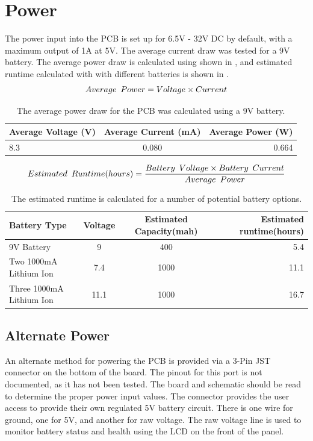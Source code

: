 \section{Power}
The power input into the PCB is set up for 6.5V - 32V DC by default, with a maximum output of 1A at 5V.  The average current draw was tested for a 9V battery. The average power draw is calculated using  shown in , and estimated runtime calculated with with  different batteries is shown in .
\begin{equation}
\label{eqn:PVI}
Average\hspace{.5em} Power = Voltage \times Current
\end{equation}
\begin{table}[H]
	\centering
	\begin{tabular}{lcr}
		\toprule
		Average Voltage (V) & Average Current (mA) & Average Power (W) \\
		\midrule
		8.3 & 0.080 & 0.664 \\
		\bottomrule
	\end{tabular}
	\caption{The average power draw for the PCB was calculated using a 9V battery.}
	\label{tab:avgPower}
\end{table}

\begin{equation}
\label{eqn:estbat}
Estimated\hspace{.5em}Runtime (hours) = \frac{Battery\hspace{.5em} Voltage \times Battery\hspace{.5em} Current}{Average\hspace{.5em} Power} 
\end{equation}
\begin{table}[H]
	\centering
	\begin{tabular}{lccr}
		\toprule
		Battery Type & Voltage & Estimated Capacity(mah) & Estimated runtime(hours) \\
		\midrule
		9V Battery & 9 & 400 & 5.4\\
		Two 1000mA Lithium Ion & 7.4 & 1000  & 11.1\\
		Three 1000mA Lithium Ion & 11.1 & 1000  & 16.7\\
		\bottomrule
	\end{tabular}
	\caption{The estimated runtime is calculated for a number of potential battery options.}
	\label{tab:batRuntime}
\end{table}
\subsection{Alternate Power}
An alternate method for powering the PCB is provided via a 3-Pin JST connector on the bottom of the board.  The pinout for this port is not documented, as it has not been tested.  The board and schematic should be read to determine the proper power input values.  The connector provides the user access to provide their own regulated 5V battery circuit.  There is one wire for ground, one for 5V, and another for raw voltage.  The raw voltage line is used to monitor battery status and health using the LCD on the front of the panel.

